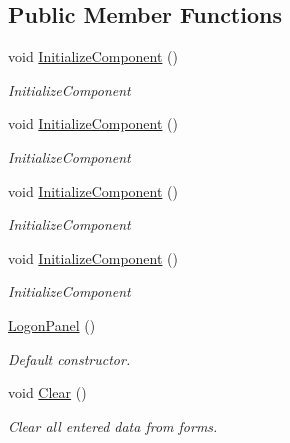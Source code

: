 \subsection*{Public Member Functions}
\begin{DoxyCompactItemize}
\item 
void \mbox{\hyperlink{class_wpf_handler_1_1_u_i_1_1_controls_1_1_logon_1_1_logon_panel_a96ecdfdcd36c8ff1f9dcf3ab85e4b461}{Initialize\+Component}} ()
\begin{DoxyCompactList}\small\item\em Initialize\+Component \end{DoxyCompactList}\item 
void \mbox{\hyperlink{class_wpf_handler_1_1_u_i_1_1_controls_1_1_logon_1_1_logon_panel_a96ecdfdcd36c8ff1f9dcf3ab85e4b461}{Initialize\+Component}} ()
\begin{DoxyCompactList}\small\item\em Initialize\+Component \end{DoxyCompactList}\item 
void \mbox{\hyperlink{class_wpf_handler_1_1_u_i_1_1_controls_1_1_logon_1_1_logon_panel_a96ecdfdcd36c8ff1f9dcf3ab85e4b461}{Initialize\+Component}} ()
\begin{DoxyCompactList}\small\item\em Initialize\+Component \end{DoxyCompactList}\item 
void \mbox{\hyperlink{class_wpf_handler_1_1_u_i_1_1_controls_1_1_logon_1_1_logon_panel_a96ecdfdcd36c8ff1f9dcf3ab85e4b461}{Initialize\+Component}} ()
\begin{DoxyCompactList}\small\item\em Initialize\+Component \end{DoxyCompactList}\item 
\mbox{\hyperlink{class_wpf_handler_1_1_u_i_1_1_controls_1_1_logon_1_1_logon_panel_ad9f500958796fd5161cd258d68b25c21}{Logon\+Panel}} ()
\begin{DoxyCompactList}\small\item\em Default constructor. \end{DoxyCompactList}\item 
void \mbox{\hyperlink{class_wpf_handler_1_1_u_i_1_1_controls_1_1_logon_1_1_logon_panel_a1307c96701838404199db630a3cc2ae6}{Clear}} ()
\begin{DoxyCompactList}\small\item\em Clear all entered data from forms. \end{DoxyCompactList}\end{DoxyCompactItemize}
